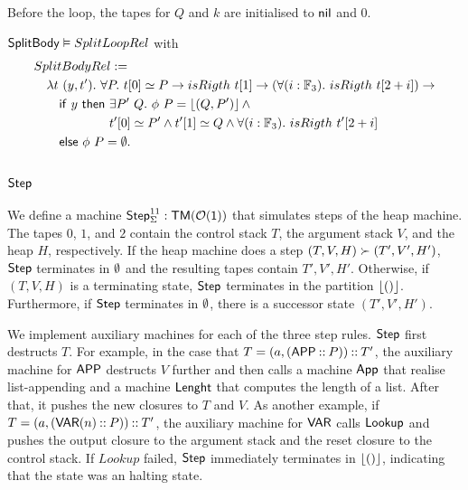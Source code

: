Before the loop, the tapes for $Q$ and $k$ are initialised to $\mathsf{nil}$ and $0$.
\begin{lemma}
  $\mathsf{SplitBody} \mathrel{\vDash} SplitLoopRel$ with
  \begin{alignat*}{1}
    & SplitBodyRel := \\
    &\quad \lambda t~(y, t').~\forall P.~t[0] \simeq P \rightarrow isRigth~t[1] \rightarrow (\forall(i:\Fin_3).~isRigth~t[2+i]) \rightarrow \\
    &\quad\quad \MS{if}~y~\MS{then}~\exists P'~Q.~ \phi~P = \Some{(Q, P')} \land \\
    &\quad\quad \phantom{\MS{if}~y~\MS{then}}~t'[0] \simeq P' \land t'[1] \simeq Q \land \forall(i:\Fin_3).~isRigth~t'[2+i] \\
    &\quad\quad \MS{else}~\phi~P=\None.
\end{alignat*}
\end{lemma}


\subsection{$\mathsf{Step}$}
\label{sec:heap-Step}


We define a machine $\mathsf{Step}_\Sigma^{11} : \mathsf{TM}(\mathcal{O}(\mathsf{1}))$ that simulates steps of the heap machine.  The tapes $0$, $1$, and $2$ contain the
control stack $T$, the argument stack $V$, and the heap $H$, respectively.  If the heap machine does a step $(T,V,H) \succ (T',V',H')$, $\mathsf{Step}$
terminates in $\emptyset$ and the resulting tapes contain $T',V',H'$.  Otherwise, if $(T,V,H)$ is a terminating state, $\mathsf{Step}$ terminates in the
partition $\left\lfloor {\ensuremath{\mathsf{()}}} \right\rfloor$.  Furthermore, if $\mathsf{Step}$ terminates in $\emptyset$, there is a successor state $(T',V',H')$.

We implement auxiliary machines for each of the three step rules.  $\mathsf{Step}$ first destructs $T$.  For example, in the case that
$T=(a, (\mathsf{APP} \mathbin{::} P)) \mathbin{::} T'$, the auxiliary machine for $\mathsf{APP}$ destructs $V$ further and then calls a machine $\mathsf{App}$ that realise
list-appending and a machine $\mathsf{Lenght}$ that computes the length of a list.  After that, it pushes the new closures to $T$ and $V$.  As another
example, if $T=(a, (\mathsf{VAR}(n) \mathbin{::} P)) \mathbin{::} T'$, the auxiliary machine for $\mathsf{VAR}$ calls $\mathsf{Lookup}$ and pushes the output closure to the
argument stack and the reset closure to the control stack.  If $Lookup$ failed, $\mathsf{Step}$ immediately terminates in $\left\lfloor {\ensuremath{\mathsf{()}}} \right\rfloor$, indicating that
the state was an halting state.

